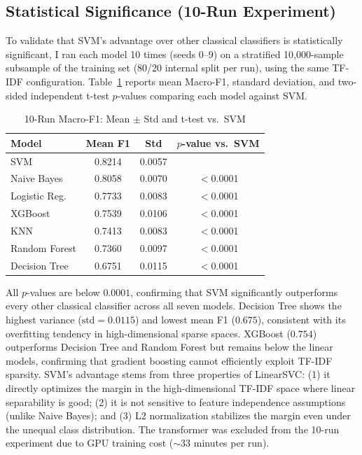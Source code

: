 \documentclass[conference]{IEEEtran}
\begin{document}
\subsection{Statistical Significance (10-Run Experiment)}

To validate that SVM's advantage over other classical classifiers is statistically
significant, I ran each model 10 times (seeds 0--9) on a stratified 10,000-sample
subsample of the training set (80/20 internal split per run), using the same TF-IDF
configuration. Table~\ref{tab:ttest} reports mean Macro-F1, standard deviation, and
two-sided independent t-test $p$-values comparing each model against SVM.

\begin{table}[htbp]
	\caption{10-Run Macro-F1: Mean $\pm$ Std and t-test vs.\ SVM}
	\label{tab:ttest}
	\begin{center}
		\footnotesize
		\renewcommand{\arraystretch}{1.2}
		\setlength{\tabcolsep}{6pt}
		\begin{tabular}{lccc}
			\toprule
			\rowcolor{headerblue}
			\color{white}\textbf{Model} & \color{white}\textbf{Mean F1} & \color{white}\textbf{Std} & \color{white}\textbf{$p$-value vs.\ SVM} \\
			\midrule
			SVM              & 0.8214 & 0.0057 &  \\
			Naive Bayes      & 0.8058 & 0.0070 & $<$0.0001 \\
			Logistic Reg.    & 0.7733 & 0.0083 & $<$0.0001 \\
			XGBoost          & 0.7539 & 0.0106 & $<$0.0001 \\
			KNN              & 0.7413 & 0.0083 & $<$0.0001 \\
			Random Forest    & 0.7360 & 0.0097 & $<$0.0001 \\
			Decision Tree    & 0.6751 & 0.0115 & $<$0.0001 \\
			\bottomrule
		\end{tabular}
	\end{center}
\end{table}

All $p$-values are below $0.0001$, confirming that SVM significantly outperforms every
other classical classifier across all seven models. Decision Tree shows the highest
variance ($\text{std}=0.0115$) and lowest mean F1 ($0.675$), consistent with its
overfitting tendency in high-dimensional sparse spaces. XGBoost ($0.754$) outperforms
Decision Tree and Random Forest but remains below the linear models, confirming that
gradient boosting cannot efficiently exploit TF-IDF sparsity. SVM's advantage stems
from three properties of LinearSVC: (1) it directly optimizes the margin in the
high-dimensional TF-IDF space where linear separability is good; (2) it is not sensitive
to feature independence assumptions (unlike Naive Bayes); and (3) L2 normalization
stabilizes the margin even under the unequal class distribution. The transformer was
excluded from the 10-run experiment due to GPU training cost ($\sim$33 minutes per run).
\end{document}
